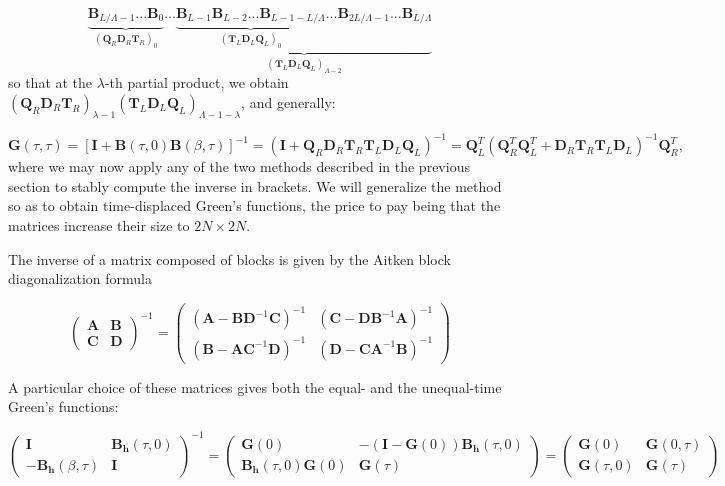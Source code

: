 \begin{equation}
\underbrace{\bm B_{L / \Lambda - 1} ...  \bm B_0}_{(\bm Q_R \bm D_R \bm T_R)_{0}} ... \underbrace{ \underbrace{\bm B_{L - 1} \bm B_{L-2} ... \bm B_{L - 1- L / \Lambda}}_{(\bm T_L \bm D_L \bm Q_L)_{0} } ...  \bm B_{2 L / \Lambda -1} ...\bm B_{L / \Lambda} }_{(\bm T_L \bm D_L \bm Q_L)_{\Lambda - 2}} 
\end{equation}
so that at the $\lambda$-th partial product, we obtain $(\bm Q_R \bm D_R \bm T_R )_{\lambda -1} (\bm T_L \bm D_L \bm Q_L )_{\Lambda - 1 - \lambda}$, and generally:

\begin{equation}
\bm G ( \tau, \tau ) = [\bm I + \bm B ( \tau, 0 ) \bm B ( \beta, \tau ) ]^{-1} = ( \bm I + \bm Q_R \bm D_R \bm T_R \bm T_L \bm D_L \bm Q_L )^{-1} = \bm Q_L^T ( \bm Q_R^T \bm Q_L^T + \bm D_R \bm T_R \bm T_L \bm D_L )^{-1} \bm Q_R^T ,
\end{equation}
where we may now apply any of the two methods described in the previous section to stably compute the inverse in brackets.
We will generalize the  method so as to obtain time-displaced Green's functions, the price to pay being that the matrices increase their size to $2 N \times 2 N$.

The inverse of a matrix composed of blocks is given by the Aitken block diagonalization formula

\begin{equation}
\begin{pmatrix}
\bm A & \bm B \\
\bm C & \bm D
\end{pmatrix}^{-1}
=
\begin{pmatrix}
( \bm A - \bm B \bm D^{-1} \bm C )^{-1} & ( \bm C - \bm D \bm B^{-1} \bm A )^{-1} \\
( \bm B - \bm A \bm C^{-1} \bm D )^{-1} & ( \bm D - \bm C \bm A^{-1} \bm B )^{-1}
\end{pmatrix}
\end{equation}

A particular choice of these matrices gives both the equal- and the unequal-time Green's functions:

\begin{equation}
\begin{pmatrix}
\bm I & \bm B_{\bm h} (\tau, 0) \\
-\bm B_{\bm h} ( \beta, \tau ) & \bm I
\end{pmatrix}^{-1}
=
\begin{pmatrix}
\bm G ( 0 ) & - ( \bm I - \bm G ( 0 ) ) \bm B_{\bm h} ( \tau, 0 )  \\
\bm B_{\bm h} ( \tau, 0 ) \bm G ( 0 ) & \bm G ( \tau ) 
\end{pmatrix}
=
\begin{pmatrix}
\bm G ( 0 ) & \bm G ( 0, \tau )  \\
\bm G ( \tau, 0 ) & \bm G ( \tau ) 
\end{pmatrix}
\end{equation}

